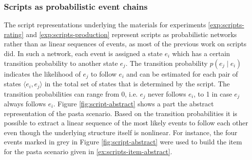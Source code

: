 \subsubsection{Scripts as probabilistic event chains}
The script representations underlying the materials for experiments \ref{exp:scripts-rating} and \ref{exp:scripts-production} represent scripts as probabilistic networks rather than as linear sequences of events, as most of the previous work on scripts did. In such a network, each event is assigned a state $e_i$ which has a certain transition probability to another state $e_j$. The transition probability $p(e_j\mathbin{|}e_i)$ indicates the likelihood of $e_j$ to follow $e_i$ and can be estimated for each pair of states $\langle e_i,e_j\rangle$ {}in the total set of states that is determined by the script. The transition probabilities can range from 0, i.e. $e_j$ never follows $e_i$, to 1 in case $e_j$ always follows $e_i$. Figure \ref{fig:script-abstract} shows a part the abstract representation of the pasta scenario. Based on the transition probabilities it is possible to extract a linear sequence of the most likely events to follow each other even though the underlying structure itself is nonlinear. For instance, the four events marked in grey in Figure \ref{fig:script-abstract} were used to build the item for the pasta scenario given in \ref{ex:scripts-item-abstract}.

